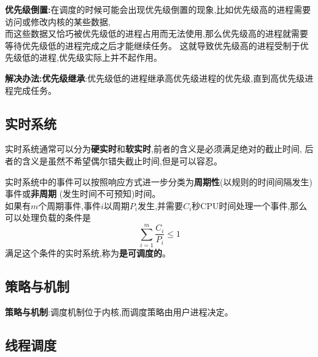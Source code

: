 \documentclass[UTF8,a4paper]{ctexart}
\newcommand{\spaceline}{\vspace{\baselineskip}}
\begin{document}
\spaceline
\textbf{优先级倒置:}在调度的时候可能会出现优先级倒置的现象,比如优先级高的进程需要访问或修改内核的某些数据,\\
而这些数据又恰巧被优先级低的进程占用而无法使用,那么优先级高的进程就需要等待优先级低的进程完成之后才能继续任务。
这就导致优先级高的进程受制于优先级低的进程,优先级实际上并不起作用。

\textbf{解决办法:优先级继承}:优先级低的进程继承高优先级进程的优先级,直到高优先级进程完成任务。

\subsection{实时系统}
实时系统通常可以分为\textbf{硬实时}和\textbf{软实时},前者的含义是必须满足绝对的截止时间,
后者的含义是虽然不希望偶尔错失截止时间,但是可以容忍。

\spaceline
实时系统中的事件可以按照响应方式进一步分类为\textbf{周期性}(以规则的时间间隔发生)事件或\textbf{非周期}
(发生时间不可预知)时间。\\
如果有$m$个周期事件,事件$i$以周期$P_i$发生,并需要$C_i$秒CPU时间处理一个事件,那么可以处理负载的条件是
\[\sum_{i = 1}^m \frac{C_i}{P_i} \leq 1\]
满足这个条件的实时系统,称为\textbf{是可调度的}。

\subsection{策略与机制}

\textbf{策略与机制}:调度机制位于内核,而调度策略由用户进程决定。

\subsection{线程调度}
\end{document}
